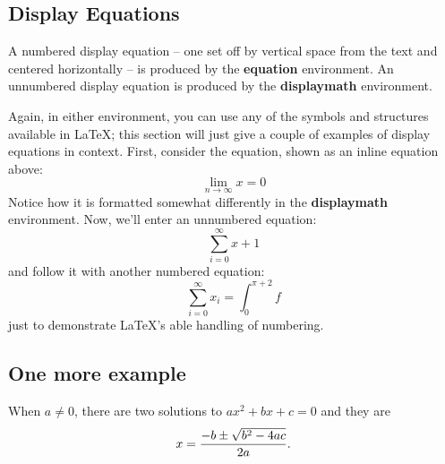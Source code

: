 \documentclass[clanek]{stucosrec}
\begin{document}
	\subsection{Display Equations}
	A numbered display equation -- one set off by vertical space
	from the text and centered horizontally -- is produced
	by the \textbf{equation} environment. An unnumbered display
	equation is produced by the \textbf{displaymath} environment.
	
	Again, in either environment, you can use any of the symbols
	and structures available in \LaTeX; this section will just
	give a couple of examples of display equations in context.
	First, consider the equation, shown as an inline equation above:
	\begin{equation}\lim_{n\rightarrow \infty}x=0\end{equation}
	Notice how it is formatted somewhat differently in
	the \textbf{displaymath}
	environment.  Now, we'll enter an unnumbered equation:
	\begin{displaymath}\sum_{i=0}^{\infty} x + 1\end{displaymath}
	and follow it with another numbered equation:
	\begin{equation}\sum_{i=0}^{\infty}x_i=\int_{0}^{\pi+2} f\end{equation}
	just to demonstrate \LaTeX's able handling of numbering.
	
	\subsection{One more example}
	When $a \ne 0$, there are two solutions to $ax^2 + bx + c = 0$ and they are
	$$x = {-b \pm \sqrt{b^2-4ac} \over 2a}.$$
	
	
	
\end{document}
